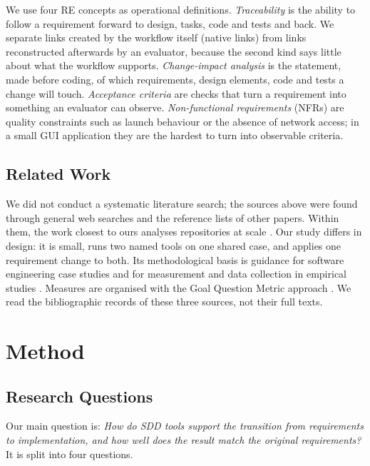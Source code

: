 \documentclass[conference]{IEEEtran}
\begin{document}
We use four RE concepts as operational definitions. \emph{Traceability}
is the ability to follow a requirement forward to design, tasks, code
and tests and back. We separate links created by the workflow itself
(native links) from links reconstructed afterwards by an evaluator,
because the second kind says little about what the workflow supports.
\emph{Change-impact analysis} is the statement, made before coding, of
which requirements, design elements, code and tests a change will touch.
\emph{Acceptance criteria} are checks that turn a requirement into
something an evaluator can observe. \emph{Non-functional requirements}
(NFRs) are quality constraints such as launch behaviour or the absence
of network access; in a small GUI application they are the hardest to
turn into observable criteria.

\subsection{Related Work}\label{related-work}

We did not conduct a systematic literature search; the sources above
were found through general web searches and the reference lists of other
papers. Within them, the work closest to ours analyses repositories at
scale \cite{claudino2026, agarwal2026, hill2026}. Our study differs in
design: it is small, runs two named tools on one shared case, and
applies one requirement change to both. Its methodological basis is
guidance for software engineering case studies \cite{runeson2009} and
for measurement and data collection in empirical studies
\cite{kitchenham2002}. Measures are organised with the Goal Question
Metric approach \cite{basili1994}. We read the bibliographic records of
these three sources, not their full texts.

\section{Method}\label{method}

\subsection{Research Questions}\label{research-questions}

Our main question is: \emph{How do SDD tools support the transition from
requirements to implementation, and how well does the result match the
original requirements?} It is split into four questions.
\end{document}
